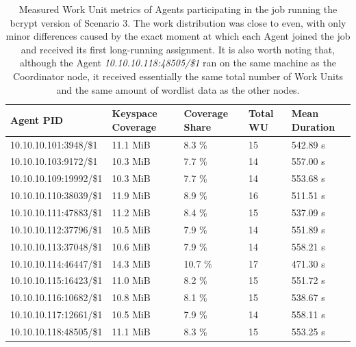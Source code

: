 \begin{table}[H]
    \centering
    \caption{Measured Work Unit metrics of Agents participating in the job running the bcrypt version of Scenario 3. The work distribution was close to even, with only minor differences caused by the exact moment at which each Agent joined the job and received its first long-running assignment. It is also worth noting that, although the Agent \textit{10.10.10.118:48505/\$1} ran on the same machine as the Coordinator node, it received essentially the same total number of Work Units and the same amount of wordlist data as the other nodes.}
    \label{tab:scenario3_bcrypt_work_units}
    \footnotesize
    \begin{tabular}{|l|l|l|l|l|}
        \hline
         \textbf{Agent PID} & \textbf{Keyspace Coverage} & \textbf{Coverage Share} & \textbf{Total WU} & \textbf{Mean Duration} \\ \hline
         10.10.10.101:3948/\$1 & 11.1 MiB & 8.3 \% & 15 & 542.89 s \\ \hline
         10.10.10.103:9172/\$1 & 10.3 MiB & 7.7 \% & 14 & 557.00 s \\ \hline
         10.10.10.109:19992/\$1 & 10.3 MiB & 7.7 \% & 14 & 553.68 s \\ \hline
         10.10.10.110:38039/\$1 & 11.9 MiB & 8.9 \% & 16 & 511.51 s \\ \hline
         10.10.10.111:47883/\$1 & 11.2 MiB & 8.4 \% & 15 & 537.09 s \\ \hline
         10.10.10.112:37796/\$1 & 10.5 MiB & 7.9 \% & 14 & 551.89 s \\ \hline
         10.10.10.113:37048/\$1 & 10.6 MiB & 7.9 \% & 14 & 558.21 s \\ \hline
         10.10.10.114:46447/\$1 & 14.3 MiB & 10.7 \% & 17 & 471.30 s \\ \hline
         10.10.10.115:16423/\$1 & 11.0 MiB & 8.2 \% & 15 & 551.72 s \\ \hline
         10.10.10.116:10682/\$1 & 10.8 MiB & 8.1 \% & 15 & 538.67 s \\ \hline
         10.10.10.117:12661/\$1 & 10.5 MiB & 7.9 \% & 14 & 558.11 s \\ \hline
         10.10.10.118:48505/\$1 & 11.1 MiB & 8.3 \% & 15 & 553.25 s \\ \hline
    \end{tabular}
\end{table}


